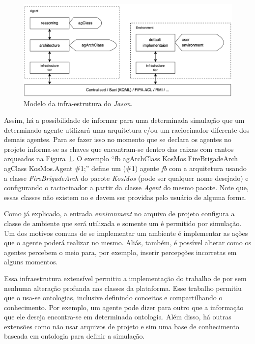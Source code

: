 \begin{figure}
               \begin{center}
               \includegraphics[width=140mm]{figuras/infra.png} 
                \end{center}
                \caption{Modelo da infra-estrutura do \emph{Jason}.}
                \label{fig-jason-infra-1}
\end{figure}

Assim, há a possibilidade de informar para uma determinada simulação que um
determinado agente utilizará uma arquitetura e/ou um raciocinador diferente
dos demais agentes. Para se fazer isso no momento que se declara os agentes
no projeto informa-se as chaves que encontram-se dentro das caixas com
cantos arqueados na Figura~\ref{fig-jason-infra-1}. O exemplo
``fb agArchClass KosMos.FireBrigadeArch agClass KosMos.Agent \#1;'' define
um (\#1) agente \emph{fb} com a arquitetura usando a classe \emph{FireBrigadeArch}
do pacote \emph{KosMos} (pode ser qualquer nome desejado) e configurando o
raciocinador a partir da classe \emph{Agent} do mesmo pacote. Note que, essas classes
não existem no \jason e devem ser providas pelo usuário de alguma forma.

Como já explicado, a entrada \emph{environment} no arquivo de projeto
configura a classe de ambiente que será utilizada e somente um
é permitido por simulação. Um dos motivos comuns de se implementar um
ambiente é implementar as ações que o agente poderá realizar no mesmo. Aliás,
também, é possível alterar como os agentes percebem o meio para, por
exemplo, inserir percepções incorretas em alguns momentos.

Essa infraestrutura extensível permitiu a implementação do trabalho de
\citet{moreira2006agent} por \citet{KlaBor09} sem nenhuma alteração profunda
nas classes da plataforma. Esse trabalho permitiu que o \jason usa-se
ontologias, inclusive definindo conceitos e compartilhando o conhecimento. Por
exemplo, um agente pode dizer para outro que a informação que ele deseja
encontra-se em determinada ontologia. Além disso, há outras extensões como
não usar arquivos de projeto e sim uma base de conhecimento baseada em
ontologia para definir a simulação.

